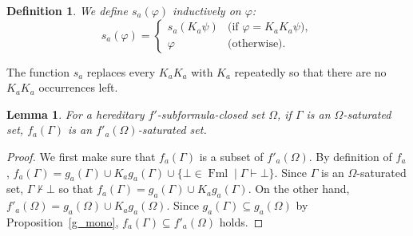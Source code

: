 \documentclass[doctor]{iscs-thesis}
\newcommand{\fml}{\operatorname{Fml}}
\newtheorem{definition}{Definition}
\newtheorem{lemma}{Lemma}
\begin{document}
\begin{definition}
 We define $s_a(\varphi)$ inductively on $\varphi$:
\[
 s_a(\varphi) = \begin{cases}
		 s_a(K_a\psi) & \text{(if $\varphi = K_aK_a\psi$)},\\
		 \varphi & \text{(otherwise)}.
		\end{cases}
\]
\end{definition}
\noindent The function $s_a$ replaces every $K_aK_a$ with $K_a$ repeatedly so that there are no
$K_aK_a$ occurrences left.

\begin{lemma}
\label{fpreserve}
 For a hereditary $f'$-subformula-closed set $\Omega$, 
 if $\Gamma$ is an $\Omega$-saturated set,
 $f_a(\Gamma)$ is an $f'_a(\Omega)$-saturated set.
\end{lemma}
\begin{proof}
 We first make sure that $f_a(\Gamma)$ is a subset of $f'_a(\Omega)$.
 By definition of $f_a$, $f_a(\Gamma) = g_a(\Gamma)\cup
 K_ag_a(\Gamma)\cup\{\bot\in\fml\mid \Gamma\vdash\bot\}$.
 Since $\Gamma$ is an $\Omega$-saturated set, $\Gamma\not\vdash\bot$ so that
 $f_a(\Gamma) = g_a(\Gamma)\cup K_ag_a(\Gamma)$.
 On the other hand, $f'_a(\Omega) = g_a(\Omega)\cup K_ag_a(\Omega)$.
 Since $g_a(\Gamma)\subseteq g_a(\Omega)$
 by Proposition~\ref{g_mono}, $f_a(\Gamma)\subseteq f'_a(\Omega)$ holds.


\end{proof}
\end{document}
